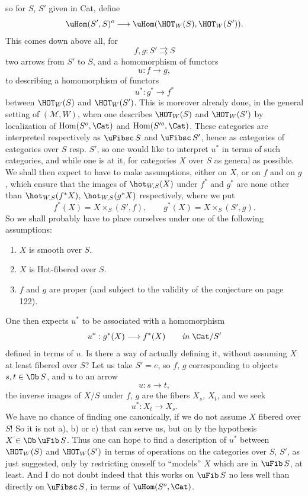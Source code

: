 
so for $S$, $S'$ given in Cat, define
\[ \uHom(S',S)^o \longrightarrow \uHom(\HOT_W(S),\HOT_W(S')). \]
This comes down above all, for
\[ f,g : S' \rightrightarrows S \]
two arrows from $S'$ to $S$, and a homomorphism of functors
\[ u : f \longrightarrow g, \]
to describing a homomorphism of functors
\[ u^* : g^* \longrightarrow f^* \]
between $\HOT_W(S)$ and $\HOT_W(S')$. This is moreover already done, in the general setting of $(\mathcal{M},W)$, when one describes $\HOT_W(S)$ and $\HOT_W(S')$ by localization of $\mathrm{Hom}(S^o,\Cat)$ and $\mathrm{Hom}(S'^o,\Cat)$. These categories are interpreted respectively as $\uFibsc\,S$ and $\uFibsc\,S'$, hence as categories of categories over $S$ resp. $S'$, so one would like to interpret $u^*$ in terms of such categories, and while one is at it, for categories $X$ over $S$ as general as possible. We shall
then expect to have to make assumptions, either on $X$, or on $f$ and on $g$, which ensure that the images of $\hot_{W,S}(X)$ under $f^*$ and $g^*$ are none other than $\hot_{W,S}(f^*X)$, $\hot_{W,S}(g^*X)$ respectively, where we put
\[ f^*(X) = X \times_S (S',f), \qquad g^*(X) = X \times_S (S',g). \]
So we shall probably have to place ourselves under one of the following assumptions:
\begin{enumerate}
\item[a)] $X$ is smooth over $S$.
\item[b)] $X$ is Hot-fibered over $S$.
\item[c)] $f$ and $g$ are proper (and subject to the validity of the conjecture on page 122).
\end{enumerate}
One then expects $u^*$ to be associated with a homomorphism
\[ u^* : g^*(X) \longrightarrow f^*(X) \qquad \textit{in } \Cat/S' \]
defined in terms of $u$. Is there a way of actually defining it, without assuming $X$ at least fibered over $S$? Let us take $S'=e$, so $f$, $g$ corresponding to objects $s,t\in\Ob\,S$, and $u$ to an arrow %
\[ u : s \longrightarrow t, \]
the inverse images of $X/S$ under $f$, $g$ are the fibers $X_s$, $X_t$, and we seek
\[ u^* : X_t \longrightarrow X_s. \]
We have no chance of finding one canonically, if we do not assume $X$ fibered over $S$! So it is not a), b) or c) that can serve us, but on%
%
%
ly the hypothesis $X\in\Ob\,\uFib\,S$. Thus one can hope to find a description of $u^*$ between $\HOT_W(S)$ and $\HOT_W(S')$ in terms of operations on the categories over $S$, $S'$, as just suggested, only by restricting oneself to ``models'' $X$ which are in $\uFib\,S$, at least. And I do not doubt indeed that this works on $\uFib\,S$ no less well than directly on $\uFibsc\,S$, in terms of $\uHom(S^o,\Cat)$.


